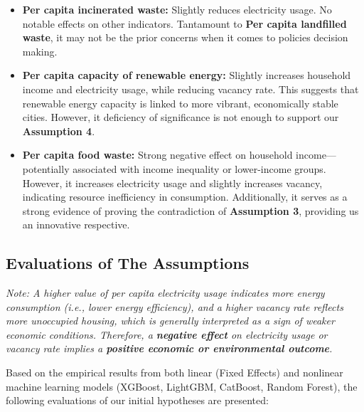 \documentclass{article}
\begin{document}
\begin{itemize}
    \item \textbf{Per capita incinerated waste:} Slightly reduces electricity usage. No notable effects on other indicators. Tantamount to \textbf{Per capita landfilled waste}, it may not be the prior concerns when it comes to policies decision making.
    
    \item \textbf{Per capita capacity of renewable energy:} Slightly increases household income and electricity usage, while reducing vacancy rate. This suggests that renewable energy capacity is linked to more vibrant, economically stable cities. However, it deficiency of significance is not enough to support our \textbf{Assumption 4}.
    
    \item \textbf{Per capita food waste:} Strong negative effect on household income—potentially associated with income inequality or lower-income groups. However, it increases electricity usage and slightly increases vacancy, indicating resource inefficiency in consumption. Additionally, it serves as a strong evidence of proving the contradiction of \textbf{Assumption 3}, providing us an innovative respective. 
\end{itemize}

\subsection{Evaluations of The Assumptions}

\textit{Note: A higher value of per capita electricity usage indicates more energy consumption (i.e., lower energy efficiency), and a higher vacancy rate reflects more unoccupied housing, which is generally interpreted as a sign of weaker economic conditions. Therefore, a \textbf{negative effect} on electricity usage or vacancy rate implies a \textbf{positive economic or environmental outcome}.}

Based on the empirical results from both linear (Fixed Effects) and nonlinear machine learning models (XGBoost, LightGBM, CatBoost, Random Forest), the following evaluations of our initial hypotheses are presented:
\end{document}
